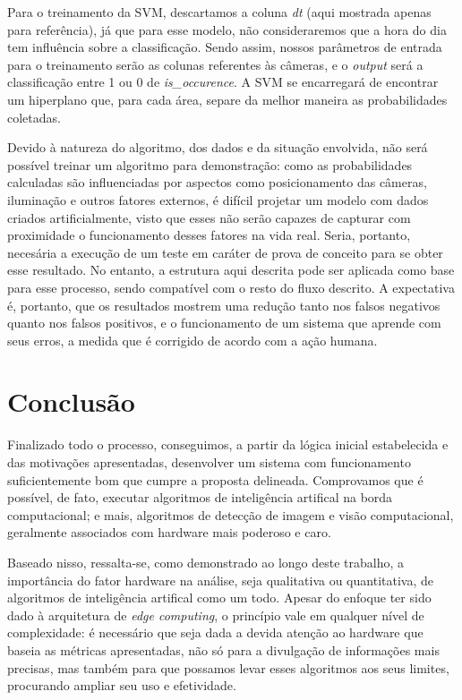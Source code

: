 \documentclass[]{politex}
\begin{document}
Para o treinamento da SVM, descartamos a coluna \textit{dt} (aqui mostrada apenas para referência), já que para esse modelo, não consideraremos que a hora do dia tem influência sobre a classificação. Sendo assim, nossos parâmetros de entrada para o treinamento serão as colunas referentes às câmeras, e o \textit{output} será a classificação entre 1 ou 0 de \textit{is\_occurence}. A SVM se encarregará de encontrar um hiperplano que, para cada área, separe da melhor maneira as probabilidades coletadas.

Devido à natureza do algoritmo, dos dados e da situação envolvida, não será possível treinar um algoritmo para demonstração: como as probabilidades calculadas são influenciadas por aspectos como posicionamento das câmeras, iluminação e outros fatores externos, é difícil projetar um modelo com dados criados artificialmente, visto que esses não serão capazes de capturar com proximidade o funcionamento desses fatores na vida real. Seria, portanto, necesária a execução de um teste em caráter de prova de conceito para se obter esse resultado. No entanto, a estrutura aqui descrita pode ser aplicada como base para esse processo, sendo compatível com o resto do fluxo descrito. A expectativa é, portanto, que os resultados mostrem uma redução tanto nos falsos negativos quanto nos falsos positivos, e o funcionamento de um sistema que aprende com seus erros, a medida que é corrigido de acordo com a ação humana.

\chapter{Conclusão}

Finalizado todo o processo, conseguimos, a partir da lógica inicial estabelecida e das motivações apresentadas, desenvolver um sistema com funcionamento suficientemente bom que cumpre a proposta delineada. Comprovamos que é possível, de fato, executar algoritmos de inteligência artifical na borda computacional; e mais, algoritmos de detecção de imagem e visão computacional, geralmente associados com hardware mais poderoso e caro.

Baseado nisso, ressalta-se, como demonstrado ao longo deste trabalho, a importância do fator hardware na análise, seja qualitativa ou quantitativa, de algoritmos de inteligência artifical como um todo. Apesar do enfoque ter sido dado à arquitetura de \textit{edge computing}, o princípio vale em qualquer nível de complexidade: é necessário que seja dada a devida atenção ao hardware que baseia as métricas apresentadas, não só para a divulgação de informações mais precisas, mas também para que possamos levar esses algoritmos aos seus limites, procurando ampliar seu uso e efetividade.
\end{document}

